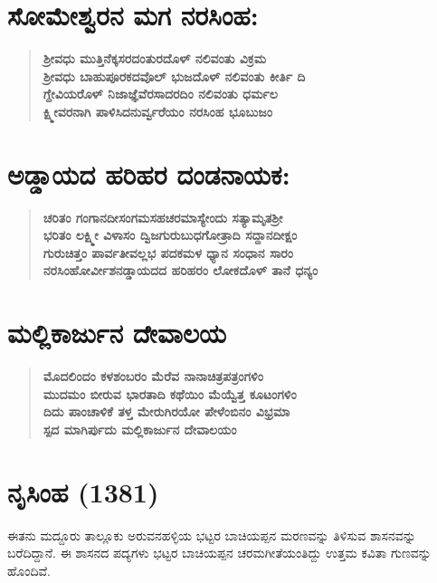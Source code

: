 \vskip 2pt

\section*{ಸೋಮೇಶ್ವರನ ಮಗ ನರಸಿಂಹ:}

\begin{verse}
\textbf{ಶ‍್ರೀವಧು ಮುತ್ತಿನೆಕ್ಕಸರದಂತುರದೊಳ್​ ನಲಿವಂತು ವಿಕ್ರಮ \\ ಶ‍್ರೀವಧು ಬಾಹುಪೂರಕದವೊಲ್​ ಭುಜದೊಳ್​ ನಲಿವಂತು ಕೀರ್ತಿ ದಿ \\ ಗ್ದೇವಿಯರೊಳ್​ ನಿಜಾಜ್ಞೆವೆರಸಾದರದಿಂ ನಲಿವಂತು ಧರ್ಮಲ \\ ಕ್ಷ್ಮೀವರನಾಗಿ ಪಾಳಿಸಿದನುರ್ವ್ವರೆಯಂ ನರಸಿಂಹ ಭೂಬುಜಂ}
\end{verse}

\vskip 2pt

\section*{ಅಡ್ಡಾಯದ ಹರಿಹರ ದಂಡನಾಯಕ:}

\begin{verse}
\textbf{ಚರಿತಂ ಗಂಗಾನದೀಸಂಗಮಸಹಚರಮಾಸ್ಯೇಂದು ಸತ್ಯಾಮೃತಶ‍್ರೀ\\ ಭರಿತಂ ಲಕ್ಷ್ಮೀ ವಿಳಾಸಂ ದ್ವಿಜಗುರುಬುಧಗೋತ್ರಾದಿ ಸದ್ದಾನದೀಕ್ಷಂ \\ ಗುರುಚಿತ್ತಂ ಪಾರ್ವತೀವಲ್ಲಭ ಪದಕಮಳ ಧ್ಯಾನ ಸಂಧಾನ ಸಾರಂ \\ ನರಸಿಂಹೋರ್ವೀಶನಡ್ಡಾಯದದ ಹರಿಹರಂ ಲೋಕದೊಳ್​ ತಾನೆ ಧನ್ಯಂ}
\end{verse}

\section*{ಮಲ್ಲಿಕಾರ್ಜುನ ದೇವಾಲಯ}

\begin{verse}
\textbf{ಮೊದಲಿಂದಂ ಕಳಶಂಬರಂ ಮೆರೆವ ನಾನಾಚಿತ್ರಪತ್ರಂಗಳಿಂ \\ ಮುದಮಂ ಬೀರುವ ಭಾರತಾದಿ ಕಥೆಯಿಂ ಮೆಯ್ವೆತ್ತ ಕೂಟಂಗಳಿಂ \\ ದಿದು ಪಾಂಚಾಳಿಕೆ ತಳ್ತ ಮೇರುಗಿರಯೋ ಪೇಳೆಂಬಿನಂ ವಿಭ್ರಮಾ \\ ಸ್ಪದ ಮಾಗಿರ್ಪುದು ಮಲ್ಲಿಕಾರ್ಜುನ ದೇವಾಲಯಂ}
\end{verse}

\section*{ನೃಸಿಂಹ (1381)}

ಈತನು ಮದ್ದೂರು ತಾಲ್ಲೂಕು ಅರುವನಹಳ್ಳಿಯ ಭಟ್ಟರ ಬಾಚಿಯಪ್ಪನ ಮರಣವನ್ನು ತಿಳಿಸುವ ಶಾಸನವನ್ನು ಬರೆದಿದ್ದಾನೆ. ಈ ಶಾಸನದ ಪದ್ಯಗಳು ಭಟ್ಟರ ಬಾಚಿಯಪ್ಪನ ಚರಮಗೀತೆಯಂತಿದ್ದು ಉತ್ತಮ ಕವಿತಾ ಗುಣವನ್ನು ಹೊಂದಿವೆ.

